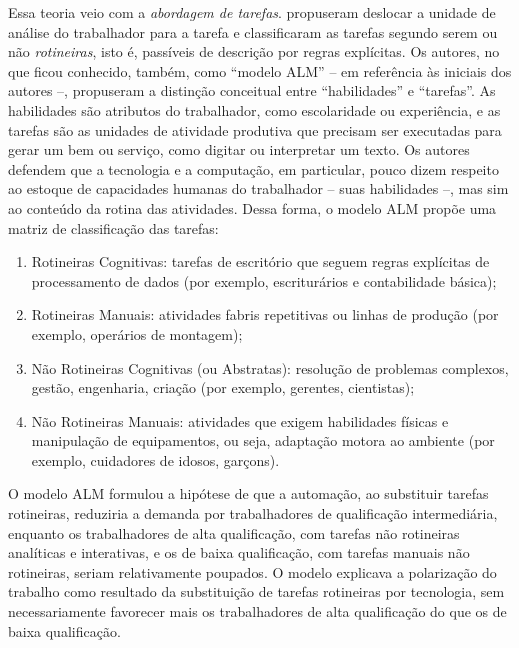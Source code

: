 
Essa teoria veio com a \emph{abordagem de tarefas}. \textcite{autorLevyMurnane2003} propuseram deslocar a unidade de análise do trabalhador para a tarefa e classificaram as tarefas segundo serem ou não \emph{rotineiras}, isto é, passíveis de descrição por regras explícitas. Os autores, no que ficou conhecido, também, como ``modelo ALM'' -- em referência às iniciais dos autores --, propuseram a distinção conceitual entre ``habilidades'' e ``tarefas''. As habilidades são atributos do trabalhador, como escolaridade ou experiência, e as tarefas são as unidades de atividade produtiva que precisam ser executadas para gerar um bem ou serviço, como digitar ou interpretar um texto. Os autores defendem que a tecnologia e a computação, em particular, pouco dizem respeito ao estoque de capacidades humanas do trabalhador -- suas habilidades --, mas sim ao conteúdo da rotina das atividades. Dessa forma, o modelo ALM propõe uma matriz de classificação das tarefas:

\begin{enumerate}
  \item Rotineiras Cognitivas: tarefas de escritório que seguem regras explícitas de processamento de dados (por exemplo, escriturários e contabilidade básica);
  \item Rotineiras Manuais: atividades fabris repetitivas ou linhas de produção (por exemplo, operários de montagem);
  \item Não Rotineiras Cognitivas (ou Abstratas): resolução de problemas complexos, gestão, engenharia, criação (por exemplo, gerentes, cientistas);
  \item Não Rotineiras Manuais: atividades que exigem habilidades físicas e manipulação de equipamentos, ou seja, adaptação motora ao ambiente (por exemplo, cuidadores de idosos, garçons).
\end{enumerate}

O modelo ALM formulou a hipótese de que a automação, ao substituir tarefas rotineiras, reduziria a demanda por trabalhadores de qualificação intermediária, enquanto os trabalhadores de alta qualificação, com tarefas não rotineiras analíticas e interativas, e os de baixa qualificação, com tarefas manuais não rotineiras, seriam relativamente poupados. O modelo explicava a polarização do trabalho como resultado da substituição de tarefas rotineiras por tecnologia, sem necessariamente favorecer mais os trabalhadores de alta qualificação do que os de baixa qualificação.


